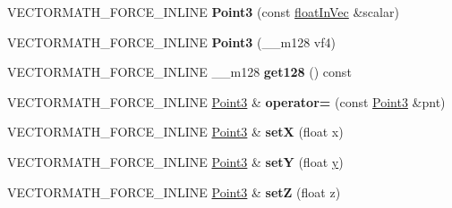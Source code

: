 \begin{DoxyCompactItemize}
\item 
\hypertarget{class_vectormath_1_1_aos_1_1_point3_a76ef26043aae56eae15ec260f7862d37}{V\+E\+C\+T\+O\+R\+M\+A\+T\+H\+\_\+\+F\+O\+R\+C\+E\+\_\+\+I\+N\+L\+I\+N\+E {\bfseries Point3} (const \hyperlink{class_vectormath_1_1float_in_vec}{float\+In\+Vec} \&scalar)}\label{class_vectormath_1_1_aos_1_1_point3_a76ef26043aae56eae15ec260f7862d37}

\item 
\hypertarget{class_vectormath_1_1_aos_1_1_point3_a988043c1c34940ef33ff2bb59afaed4c}{V\+E\+C\+T\+O\+R\+M\+A\+T\+H\+\_\+\+F\+O\+R\+C\+E\+\_\+\+I\+N\+L\+I\+N\+E {\bfseries Point3} (\+\_\+\+\_\+m128 vf4)}\label{class_vectormath_1_1_aos_1_1_point3_a988043c1c34940ef33ff2bb59afaed4c}

\item 
\hypertarget{class_vectormath_1_1_aos_1_1_point3_a034eb6f8cbc0605d23d090219f1b596b}{V\+E\+C\+T\+O\+R\+M\+A\+T\+H\+\_\+\+F\+O\+R\+C\+E\+\_\+\+I\+N\+L\+I\+N\+E \+\_\+\+\_\+m128 {\bfseries get128} () const }\label{class_vectormath_1_1_aos_1_1_point3_a034eb6f8cbc0605d23d090219f1b596b}

\item 
\hypertarget{class_vectormath_1_1_aos_1_1_point3_ac73c3adfeb7fcc847e6d1a2afde4b85b}{V\+E\+C\+T\+O\+R\+M\+A\+T\+H\+\_\+\+F\+O\+R\+C\+E\+\_\+\+I\+N\+L\+I\+N\+E \hyperlink{class_vectormath_1_1_aos_1_1_point3}{Point3} \& {\bfseries operator=} (const \hyperlink{class_vectormath_1_1_aos_1_1_point3}{Point3} \&pnt)}\label{class_vectormath_1_1_aos_1_1_point3_ac73c3adfeb7fcc847e6d1a2afde4b85b}

\item 
\hypertarget{class_vectormath_1_1_aos_1_1_point3_a698bc3129afa7654fcb60cf3616908d5}{V\+E\+C\+T\+O\+R\+M\+A\+T\+H\+\_\+\+F\+O\+R\+C\+E\+\_\+\+I\+N\+L\+I\+N\+E \hyperlink{class_vectormath_1_1_aos_1_1_point3}{Point3} \& {\bfseries set\+X} (float x)}\label{class_vectormath_1_1_aos_1_1_point3_a698bc3129afa7654fcb60cf3616908d5}

\item 
\hypertarget{class_vectormath_1_1_aos_1_1_point3_a355035b13db8ff3fdd8610a58ae94227}{V\+E\+C\+T\+O\+R\+M\+A\+T\+H\+\_\+\+F\+O\+R\+C\+E\+\_\+\+I\+N\+L\+I\+N\+E \hyperlink{class_vectormath_1_1_aos_1_1_point3}{Point3} \& {\bfseries set\+Y} (float \hyperlink{_ice_utils_8h_aa7ffaed69623192258fb8679569ff9ba}{y})}\label{class_vectormath_1_1_aos_1_1_point3_a355035b13db8ff3fdd8610a58ae94227}

\item 
\hypertarget{class_vectormath_1_1_aos_1_1_point3_a89052b7c7e67cda2c8072d1cf0b0122b}{V\+E\+C\+T\+O\+R\+M\+A\+T\+H\+\_\+\+F\+O\+R\+C\+E\+\_\+\+I\+N\+L\+I\+N\+E \hyperlink{class_vectormath_1_1_aos_1_1_point3}{Point3} \& {\bfseries set\+Z} (float z)}\label{class_vectormath_1_1_aos_1_1_point3_a89052b7c7e67cda2c8072d1cf0b0122b}


\end{DoxyCompactItemize}
